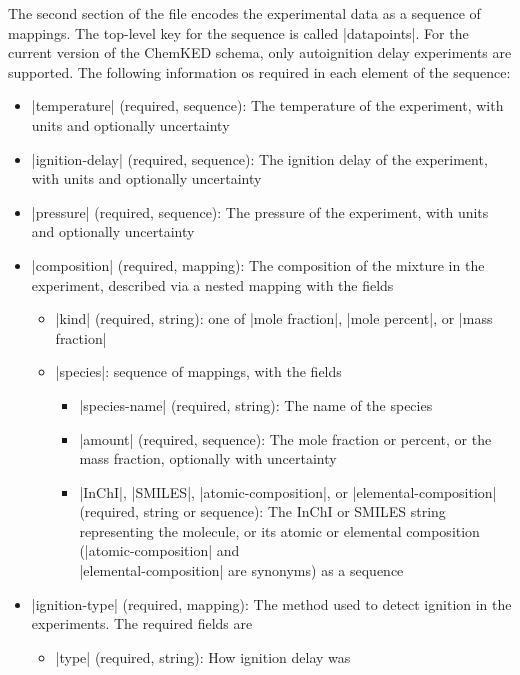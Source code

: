 \documentclass[12pt]{ijck}
\newcommand\ck{ChemKED}
\begin{document}
The second section of the file encodes the experimental data as a sequence of mappings. The
top-level key for the sequence is called \yabox|datapoints|. For the current version of the \ck{}
schema, only autoignition delay experiments are supported. The following information os required in
each element of the sequence:
%
\begin{itemize}
    \item \yabox|temperature| (required, sequence): The temperature of the
    experiment, with units and optionally uncertainty
    \item \yabox|ignition-delay| (required, sequence): The ignition delay of the
    experiment, with units and optionally uncertainty
    \item \yabox|pressure| (required, sequence): The pressure of the experiment,
    with units and optionally uncertainty
    \item \yabox|composition| (required, mapping): The composition of the
    mixture in the experiment, described via a nested mapping with the fields
    \begin{itemize}
        \item \yabox|kind| (required, string): one of \yabox|mole fraction|, \yabox|mole percent|, or \yabox|mass fraction|
        \item \yabox|species|: sequence of mappings, with the fields
        \begin{itemize}
            \item \yabox|species-name| (required, string): The name of the species
            \item \yabox|amount| (required, sequence): The mole fraction or percent, or the mass fraction, optionally with uncertainty
            \item \yabox|InChI|, \yabox|SMILES|, \yabox|atomic-composition|, or
            \yabox|elemental-composition| (required, string or sequence): The InChI
            or SMILES string representing the molecule, or its atomic or elemental
            composition (\yabox|atomic-composition| and\\
            \yabox|elemental-composition| are synonyms) as a sequence
        \end{itemize}
    \end{itemize}
    \item \yabox|ignition-type| (required, mapping): The method used to detect
    ignition in the experiments. The required fields are
    \begin{itemize}
        \item \yabox|type| (required, string): How ignition delay was

\end{itemize}
\end{itemize}
\end{document}

